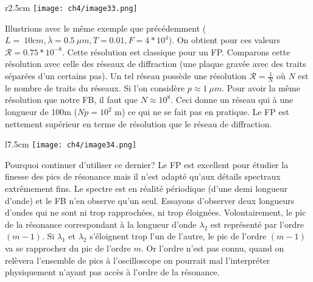 \newpage
	\begin{wrapfigure}[6]{r}{2.5cm}
	\vspace{-3mm}
	\texttt{[image: ch4/image33.png]}
	\end{wrapfigure}
Illustrions avec le même exemple que précédemment ($L=\ 10cm, \overline{\lambda}=0.5\ \mu m, T=0.01, 
F=4*10^4$). On obtient pour ces valeurs $\mathcal{R} = 0.75*10^{-8}$. Cette résolution est classique 
pour un FP. Comparons cette résolution avec celle des réseaux de diffraction (une plaque gravée avec 
des traits séparées d'un certains pas). Un tel réseau possède une résolution $\mathcal{R}=\frac{1}{N}$ 
où $N$ est le nombre de traits du réseaux. Si l'on considère $p\approx 1\ \mu m.$ Pour avoir la même 
résolution que notre FB, il faut que $N\approx 10^8$. Ceci donne un réseau qui à une longueur de 
100m ($Np=10^2$ m) ce qui ne se fait pas en pratique. Le FP est nettement supérieur en terme de 
résolution que le réseau de diffraction.\\

	\begin{wrapfigure}[11]{l}{7.5cm}
	\vspace{-5mm}
	\texttt{[image: ch4/image34.png]}
	\end{wrapfigure}
Pourquoi continuer d'utiliser ce dernier? Le FP est excellent 
pour étudier la finesse des pics de résonance mais il n'est adapté qu'aux détails spectraux extrêmement 
fins. Le spectre est en réalité périodique (d'une demi longueur d'onde) et le FB n'en observe qu'un seul. 
Essayons d'observer deux longueurs d'ondes qui ne sont ni trop rapprochées, ni trop éloignées. Volontairement, 
le pic de la résonance correspondant à la longueur d'onde $\lambda_2$ est représenté par l'ordre $(m-1)$.
Si $\lambda_1$ et $\lambda_2$ s'éloignent trop l'un de l'autre, le pic de l'ordre $(m-1)$ va se rapprocher 
du pic de l'ordre $m$. Or l'ordre n'est pas connu, quand on relèvera l'ensemble de pics à l'oscilloscope 
on pourrait mal l'interpréter physiquement n'ayant pas accès à l'ordre de la résonance.\\


